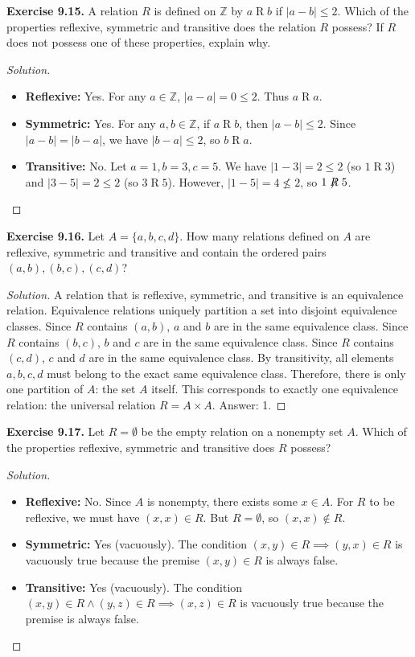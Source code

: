 \documentclass[11pt, a4paper]{article}
\theoremstyle{definition}
\theoremstyle{remark}
\newcommand{\Z}{\mathbb{Z}}
\begin{document}
\vspace{1em}
\textbf{Exercise 9.15.} A relation $R$ is defined on $\Z$ by $a \mathrel{R} b$ if $|a - b| \le 2$. Which of the properties reflexive, symmetric and transitive does the relation $R$ possess? If $R$ does not possess one of these properties, explain why.
\begin{proof}[Solution]
\begin{itemize}
    \item \textbf{Reflexive:} Yes. For any $a \in \Z$, $|a - a| = 0 \le 2$. Thus $a \mathrel{R} a$.
    \item \textbf{Symmetric:} Yes. For any $a, b \in \Z$, if $a \mathrel{R} b$, then $|a - b| \le 2$. Since $|a - b| = |b - a|$, we have $|b - a| \le 2$, so $b \mathrel{R} a$.
    \item \textbf{Transitive:} No. Let $a = 1, b = 3, c = 5$. We have $|1 - 3| = 2 \le 2$ (so $1 \mathrel{R} 3$) and $|3 - 5| = 2 \le 2$ (so $3 \mathrel{R} 5$). However, $|1 - 5| = 4 \not\le 2$, so $1 \not\mathrel{R} 5$.
\end{itemize}
\end{proof}

\vspace{1em}
\textbf{Exercise 9.16.} Let $A = \{a, b, c, d\}$. How many relations defined on $A$ are reflexive, symmetric and transitive and contain the ordered pairs $(a, b), (b, c), (c, d)$?
\begin{proof}[Solution]
A relation that is reflexive, symmetric, and transitive is an equivalence relation. Equivalence relations uniquely partition a set into disjoint equivalence classes.
Since $R$ contains $(a, b)$, $a$ and $b$ are in the same equivalence class.
Since $R$ contains $(b, c)$, $b$ and $c$ are in the same equivalence class.
Since $R$ contains $(c, d)$, $c$ and $d$ are in the same equivalence class.
By transitivity, all elements $a, b, c, d$ must belong to the exact same equivalence class. 
Therefore, there is only one partition of $A$: the set $A$ itself. 
This corresponds to exactly one equivalence relation: the universal relation $R = A \times A$.
Answer: 1.
\end{proof}

\vspace{1em}
\textbf{Exercise 9.17.} Let $R = \emptyset$ be the empty relation on a nonempty set $A$. Which of the properties reflexive, symmetric and transitive does $R$ possess?
\begin{proof}[Solution]
\begin{itemize}
    \item \textbf{Reflexive:} No. Since $A$ is nonempty, there exists some $x \in A$. For $R$ to be reflexive, we must have $(x, x) \in R$. But $R = \emptyset$, so $(x, x) \notin R$.
    \item \textbf{Symmetric:} Yes (vacuously). The condition $(x, y) \in R \implies (y, x) \in R$ is vacuously true because the premise $(x, y) \in R$ is always false.
    \item \textbf{Transitive:} Yes (vacuously). The condition $(x, y) \in R \land (y, z) \in R \implies (x, z) \in R$ is vacuously true because the premise is always false.
\end{itemize}
\end{proof}
\end{document}

